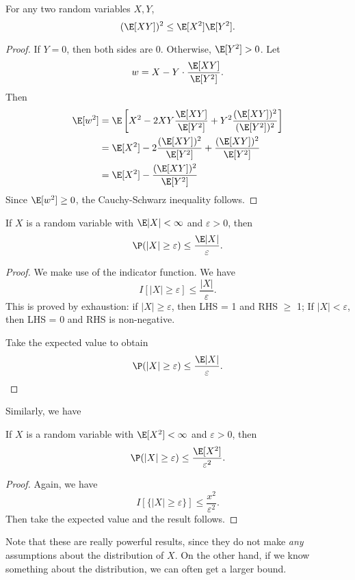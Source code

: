 \documentclass[a4paper]{article}
\begin{document}
\begin{thm}
  For any two random variables $X, Y$,
  \[
    (\E[XY])^2 \leq \E[X^2]\E[Y^2].
  \]
\end{thm}

\begin{proof}
  If $Y = 0$, then both sides are $0$. Otherwise, $\E[Y^2] > 0$. Let
  \[
    w = X - Y\cdot \frac{\E[XY]}{\E[Y^2]}.
  \]
  Then
  \begin{align*}
    \E[w^2] &= \E\left[X^2 - 2XY\frac{\E[XY]}{\E[Y^2]} + Y^2\frac{(\E[XY])^2}{(\E[Y^2])^2}\right]\\
    &= \E[X^2] - 2\frac{(\E[XY])^2}{\E[Y^2]} + \frac{(\E[XY])^2}{\E[Y^2]}\\
    &= \E[X^2] - \frac{(\E[XY])^2}{\E[Y^2]}
  \end{align*}
  Since $\E[w^2] \geq 0$, the Cauchy-Schwarz inequality follows.
\end{proof}

\begin{thm}
  If $X$ is a random variable with $\E|X| < \infty$ and $\varepsilon > 0$, then
  \[
    \P(|X| \geq \varepsilon) \leq \frac{\E|X|}{\varepsilon}.
  \]
\end{thm}

\begin{proof}
  We make use of the indicator function. We have
  \[
    I[|X|\geq \varepsilon] \leq \frac{|X|}{\varepsilon}.
  \]
  This is proved by exhaustion: if $|X| \geq \varepsilon$, then LHS = 1 and RHS $\geq$ 1; If $|X| < \varepsilon$, then LHS = 0 and RHS is non-negative.

  Take the expected value to obtain
  \[
    \P(|X| \geq \varepsilon) \leq \frac{\E |X|}{\varepsilon}.\qedhere
  \]
\end{proof}

Similarly, we have
\begin{thm}
  If $X$ is a random variable with $\E[X^2] < \infty$ and $\varepsilon > 0$, then
  \[
    \P(|X| \geq \varepsilon) \leq \frac{\E[X^2]}{\varepsilon^2}.
  \]
\end{thm}

\begin{proof}
  Again, we have
  \[
    I[\{|X|\geq \varepsilon\}] \leq \frac{x^2}{\varepsilon^2}.
  \]
  Then take the expected value and the result follows.
\end{proof}
Note that these are really powerful results, since they do not make \emph{any} assumptions about the distribution of $X$. On the other hand, if we know something about the distribution, we can often get a larger bound.
\end{document}
